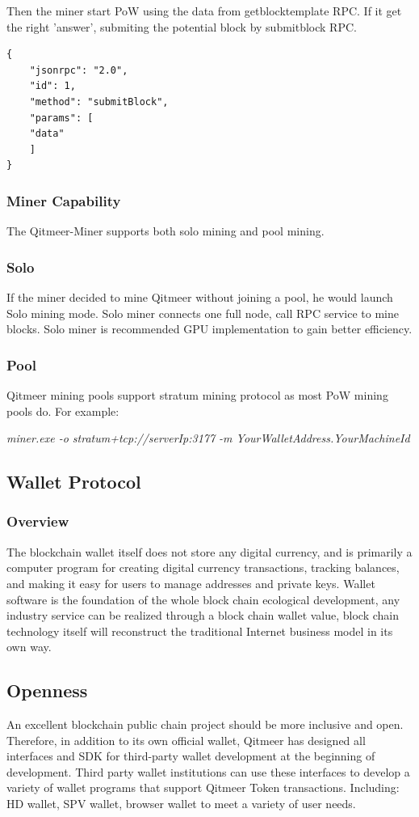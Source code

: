 \documentclass[a4paper,11pt]{article}
\begin{document}
Then the miner start PoW using the data from getblocktemplate RPC. If it get the right 'answer', submiting the potential block by submitblock RPC.
\begin{lstlisting}
{
	"jsonrpc": "2.0",
	"id": 1,
	"method": "submitBlock",
	"params": [
	"data"
	]
}
\end{lstlisting}

\subsubsection{Miner Capability}

The Qitmeer-Miner supports both solo mining and pool mining.

\subsubsection*{Solo}
If the miner  decided to mine Qitmeer without joining a pool, he would launch Solo mining mode. Solo miner connects one full node, call RPC service to mine blocks. Solo miner is recommended GPU implementation to gain better efficiency.

\subsubsection*{Pool}
Qitmeer mining pools support stratum mining protocol as most PoW mining pools do.
For example:

\emph{miner.exe -o stratum+tcp://serverIp:3177 -m YourWalletAddress.YourMachineId}

\subsection{Wallet Protocol}
\subsubsection{Overview}
   The blockchain wallet itself does not store any digital currency, and is primarily a computer program for creating digital currency transactions, tracking balances, and making it easy for users to manage addresses and private keys. Wallet software is the foundation of the whole block chain ecological development, any industry service can be realized through a block chain wallet value, block chain technology itself will reconstruct the traditional Internet business model in its own way. 
\subsection*{Openness}
   An excellent blockchain public chain project should be more inclusive and open. Therefore, in addition to its own official wallet, Qitmeer has designed all interfaces and SDK for third-party wallet development at the beginning of development. Third party wallet institutions can use these interfaces to develop a variety of wallet programs that support Qitmeer Token transactions. Including: HD wallet, SPV wallet, browser wallet to meet a variety of user needs.
\end{document}
